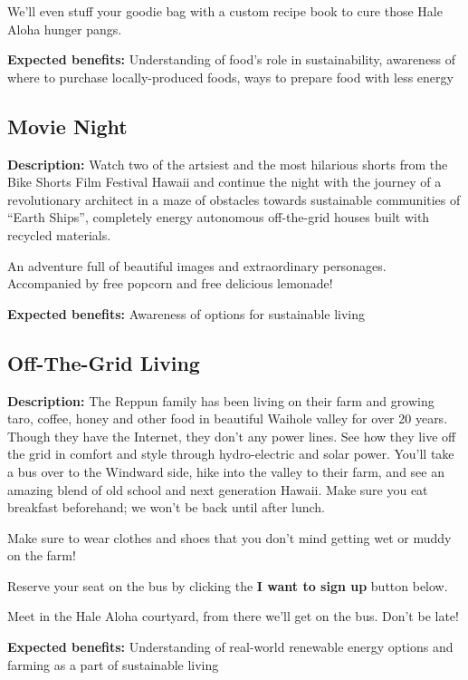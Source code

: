 We'll even stuff your goodie bag with a custom recipe book to cure those Hale Aloha hunger pangs.

\vspace{2ex}
\textbf{Expected benefits:} Understanding of food's role in sustainability, awareness of where to purchase locally-produced foods, ways to prepare food with less energy


\subsection{Movie Night}

\textbf{Description:} Watch two of the artsiest and the most hilarious shorts from the Bike Shorts Film Festival Hawaii and continue the night with the journey of a revolutionary architect in a maze of obstacles towards sustainable communities of ``Earth Ships'', completely energy autonomous off-the-grid houses built with recycled materials.

An adventure full of beautiful images and extraordinary personages. Accompanied by free popcorn and free delicious lemonade!

\vspace{2ex}
\textbf{Expected benefits:} Awareness of options for sustainable living


\subsection{Off-The-Grid Living}

\textbf{Description:} The Reppun family has been living on their farm and growing taro, coffee, honey and other food in beautiful Waihole valley for over 20 years.  Though they have the Internet, they don't any power lines. See how they live off the grid in comfort and style through hydro-electric and solar power. You'll take a bus over to the Windward side, hike into the valley to their farm, and see an amazing blend of old school and next generation Hawaii. Make sure you eat breakfast beforehand; we won't be back until after lunch.

Make sure to wear clothes and shoes that you don't mind getting wet or muddy on the farm!

Reserve your seat on the bus by clicking the \textbf{I want to sign up} button below. 

Meet in the Hale Aloha courtyard, from there we'll get on the bus.  Don't be late!

\vspace{2ex}
\textbf{Expected benefits:} Understanding of real-world renewable energy options and farming as a part of sustainable living


